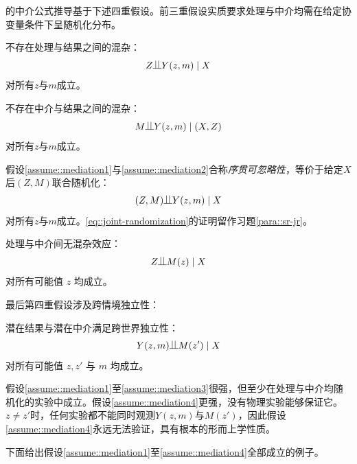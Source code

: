 \citet{Pearl::2001}的中介公式推导基于下述四重假设。前三重假设实质要求处理与中介均需在给定协变量条件下呈随机化分布。

\begin{assumption}
\label{assume::mediation1}
不存在处理与结果之间的混杂：
$$
Z\ind Y(z,m)\mid X
$$
对所有$z$与$m$成立。
\end{assumption}

\begin{assumption}
\label{assume::mediation2}
不存在中介与结果之间的混杂：
$$
M \ind Y(z,m) \mid (X, Z)
$$
对所有$z$与$m$成立。
\end{assumption}

假设\ref{assume::mediation1}与\ref{assume::mediation2}合称{\it 序贯可忽略性}，等价于给定$X$后$(Z, M)$联合随机化：
\begin{eqnarray}\label{eq::joint-randomization}
(Z, M) \ind Y(z,m)\mid X
\end{eqnarray}
对所有$z$与$m$成立。\eqref{eq::joint-randomization}的证明留作习题\ref{para::sr-jr}。 



\begin{assumption}
\label{assume::mediation3}
处理与中介间无混杂效应：
$$
Z \ind M(z) \mid X
$$ 
对所有可能值 $z$ 均成立。 
\end{assumption}

最后第四重假设涉及跨情境独立性： 

\begin{assumption}
\label{assume::mediation4}
潜在结果与潜在中介满足跨世界独立性：
$$
Y(z,m) \ind M(z') \mid X
$$ 
对所有可能值 $z,z'$ 与 $m$ 均成立。 
\end{assumption}


假设\ref{assume::mediation1}至\ref{assume::mediation3}很强，但至少在处理与中介均随机化的实验中成立。假设\ref{assume::mediation4}更强，没有物理实验能够保证它。$z\neq z'$时，任何实验都不能同时观测$Y(z,m)$与$ M(z') $，因此假设\ref{assume::mediation4}永远无法验证，具有根本的形而上学性质。 

下面给出假设\ref{assume::mediation1}至\ref{assume::mediation4}全部成立的例子。 

